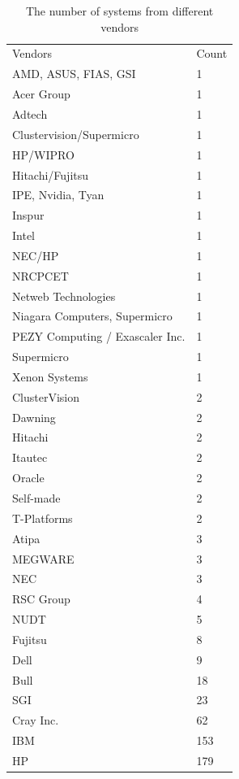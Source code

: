 \documentclass[11pt]{article}
\begin{document}
\begin{enumerate}
\begin{enumerate}
\begin{table}[ht]
\label{table:table1}
\caption{The number of systems from different vendors}
\begin{tabular}{ll}
Vendors                         & Count \\
AMD, ASUS, FIAS, GSI            & 1     \\
Acer Group                      & 1     \\
Adtech                          & 1     \\
Clustervision/Supermicro        & 1     \\
HP/WIPRO                        & 1     \\
Hitachi/Fujitsu                 & 1     \\
IPE, Nvidia, Tyan               & 1     \\
Inspur                          & 1     \\
Intel                           & 1     \\
NEC/HP                          & 1     \\
NRCPCET                         & 1     \\
Netweb Technologies             & 1     \\
Niagara Computers, Supermicro   & 1     \\
PEZY Computing / Exascaler Inc. & 1     \\
Supermicro                      & 1     \\
Xenon Systems                   & 1     \\
ClusterVision                   & 2     \\
Dawning                         & 2     \\
Hitachi                         & 2     \\
Itautec                         & 2     \\
Oracle                          & 2     \\
Self-made                       & 2     \\
T-Platforms                     & 2     \\
Atipa                           & 3     \\
MEGWARE                         & 3     \\
NEC                             & 3     \\
RSC Group                       & 4     \\
NUDT                            & 5     \\
Fujitsu                         & 8     \\
Dell                            & 9     \\
Bull                            & 18    \\
SGI                             & 23    \\
Cray Inc.                       & 62    \\
IBM                             & 153   \\
HP                              & 179  
\end{tabular}
\end{table}


\end{enumerate}
\end{enumerate}
\end{document}
